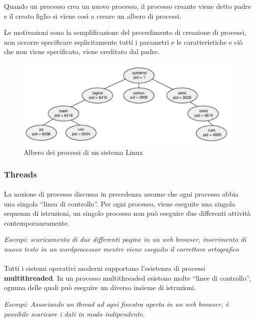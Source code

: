Quando un processo crea un nuovo processo, il processo creante viene
detto padre e il creato figlio
si viene così a creare un albero di processi.

Le motivazioni sono la semplificazione del procedimento di creazione di processi, non occorre specificare esplicitamente tutti i parametri e le caratteristiche e ciò che non viene specificato, viene ereditato dal padre.

\begin{figure}[h]
    \centering
\includegraphics[width=0.6\linewidth]{Images/Screenshot 2024-12-23 at 12-42-11 so-02.1-scheduling - so-02.1-scheduling.pdf.png}
    \caption{Albero dei processi di un sistema Linux}
\end{figure}

\subsubsection{Threads}
\paragraph{}
La nozione di processo discussa in precedenza assume che ogni
processo abbia una singola “linea di controllo”. Per ogni processo, viene eseguite una singola sequenza di istruzioni, un singolo processo non può eseguire due differenti attività
contemporaneamente.

\textit{Esempi: scaricamento di due differenti pagine in un web browser, inserimento di nuovo testo in un wordprocessor mentre viene eseguito il correttore ortografico}

\paragraph{}
Tutti i sistemi operativi moderni supportano l’esistenza di processi \textbf{multithreaded}. In un processo multithreaded esistono molte “linee di controllo”, ognuna
delle quali può eseguire un diverso insieme di istruzioni.

\textit{Esempi: Associando un thread ad ogni finestra aperta in un web browser, è possibile scaricare i dati in modo indipendente.
}

